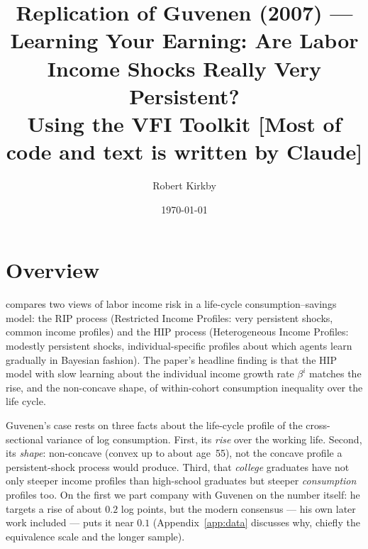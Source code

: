 \documentclass[11pt,fleqn]{article}
\begin{document}
\title{Replication of Guvenen (2007) --- Learning Your Earning: Are Labor Income Shocks Really Very Persistent? \\ \vspace{2mm} \normalsize{Using the VFI Toolkit [Most of code and text is written by Claude]}}
\author{Robert Kirkby}
\date{\today}
\maketitle

\section{Overview}

\cite{Guvenen2007} compares two views of labor income risk in a life-cycle consumption--savings model: the RIP process (Restricted Income Profiles: very persistent shocks, common income profiles) and the HIP process (Heterogeneous Income Profiles: modestly persistent shocks, individual-specific profiles about which agents learn gradually in Bayesian fashion). The paper's headline finding is that the HIP model with slow learning about the individual income growth rate $\beta^i$ matches the rise, and the non-concave shape, of within-cohort consumption inequality over the life cycle.

Guvenen's case rests on three facts about the life-cycle profile of the cross-sectional variance of log consumption. First, its \emph{rise} over the working life. Second, its \emph{shape}: non-concave (convex up to about age~55), not the concave profile a persistent-shock process would produce. Third, that \emph{college} graduates have not only steeper income profiles than high-school graduates but steeper \emph{consumption} profiles too. On the first we part company with Guvenen on the number itself: he targets a rise of about $0.2$ log points, but the modern consensus --- his own later work included --- puts it near $0.1$ (Appendix~\ref{app:data} discusses why, chiefly the equivalence scale and the longer sample).
\end{document}
